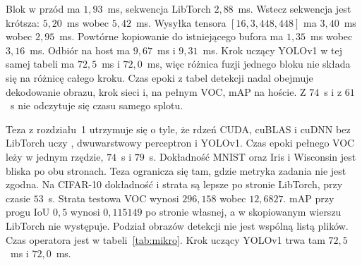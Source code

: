 Blok  w przód ma \(1{,}93\)~ms, sekwencja LibTorch \(2{,}88\)~ms. Wstecz sekwencja jest krótsza: \(5{,}20\)~ms wobec \(5{,}42\)~ms. Wysyłka  tensora \([16, 3, 448, 448]\) ma \(3{,}40\)~ms wobec \(2{,}95\)~ms. Powtórne kopiowanie do istniejącego bufora ma \(1{,}35\)~ms wobec \(3{,}16\)~ms. Odbiór na host ma \(9{,}67\)~ms i \(9{,}31\)~ms. Krok uczący YOLOv1 w tej samej tabeli ma \(72{,}5\)~ms i \(72{,}0\)~ms, więc różnica fuzji jednego bloku nie składa się na różnicę całego kroku. Czas epoki z tabel detekcji nadal obejmuje dekodowanie obrazu, krok sieci i, na pełnym VOC, mAP na hoście. Z \(74\)~s i z \(61\)~s nie odczytuje się czasu samego splotu.

Teza z rozdziału~1 utrzymuje się o tyle, że rdzeń CUDA, cuBLAS i cuDNN bez LibTorch uczy , dwuwarstwowy perceptron i YOLOv1. Czas epoki pełnego VOC leży w jednym rzędzie, \(74\)~s i \(79\)~s. Dokładność MNIST oraz Iris i Wisconsin jest bliska po obu stronach. Teza ogranicza się tam, gdzie metryka zadania nie jest zgodna. Na CIFAR-10 dokładność i strata są lepsze po stronie LibTorch, przy czasie \(53\)~s. Strata testowa VOC wynosi \(296{,}158\) wobec \(12{,}6827\). mAP przy progu IoU \(0{,}5\) wynosi \(0{,}115149\) po stronie własnej, a w skopiowanym wierszu LibTorch nie występuje. Podział obrazów detekcji nie jest wspólną listą plików. Czas operatora jest w tabeli~\ref{tab:mikro}. Krok uczący YOLOv1 trwa tam \(72{,}5\)~ms i \(72{,}0\)~ms.
